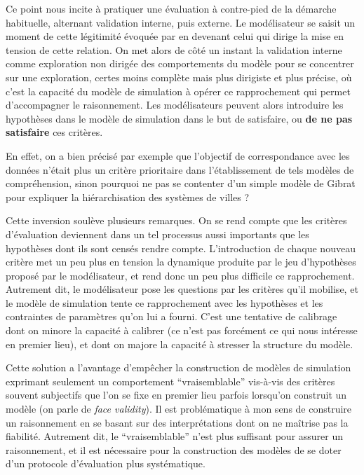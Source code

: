 Ce point nous incite à pratiquer une évaluation à contre-pied de la démarche habituelle, alternant validation interne, puis externe. Le modélisateur se saisit un moment de cette légitimité évoquée par \textcite{Bulle2005} en devenant celui qui dirige la mise en tension de cette relation. On met alors de côté un instant la validation interne comme exploration non dirigée des comportements du modèle pour se concentrer sur une exploration, certes moins complète mais plus dirigiste et plus précise, où c'est la capacité du modèle de simulation à opérer ce rapprochement qui permet d'accompagner le raisonnement. Les modélisateurs peuvent alors introduire les hypothèses dans le modèle de simulation dans le but de satisfaire, ou \textbf{de ne pas satisfaire} ces critères.

En effet, on a bien précisé par exemple que l'objectif de correspondance avec les données n'était plus un critère prioritaire dans l'établissement de tels modèles de compréhension, sinon pourquoi ne pas se contenter d'un simple modèle de Gibrat pour expliquer la hiérarchisation des systèmes de villes ?

Cette inversion soulève plusieurs remarques. On se rend compte que les critères d'évaluation deviennent dans un tel processus aussi importants que les hypothèses dont ils sont censés rendre compte. L'introduction de chaque nouveau critère met un peu plus en tension la dynamique produite par le jeu d'hypothèses proposé par le modélisateur, et rend donc un peu plus difficile ce rapprochement. Autrement dit, le modélisateur pose les questions par les critères qu'il mobilise, et le modèle de simulation tente ce rapprochement avec les hypothèses et les contraintes de paramètres qu'on lui a fourni. C'est une tentative de calibrage dont on minore la capacité à calibrer (ce n'est pas forcément ce qui nous intéresse en premier lieu), et dont on majore la capacité à stresser la structure du modèle.

Cette solution a l'avantage d'empêcher la construction de modèles de simulation exprimant seulement un comportement \enquote{vraisemblable} vis-à-vis des critères souvent subjectifs que l'on se fixe en premier lieu parfois lorsqu'on construit un modèle (on parle de \textit{face validity}). Il est problématique à mon sens de construire un raisonnement en se basant sur des interprétations dont on ne maîtrise pas la fiabilité. Autrement dit, le \enquote{vraisemblable} n'est plus suffisant pour assurer un raisonnement, et il est nécessaire pour la construction des modèles de se doter d'un protocole d'évaluation plus systématique.

